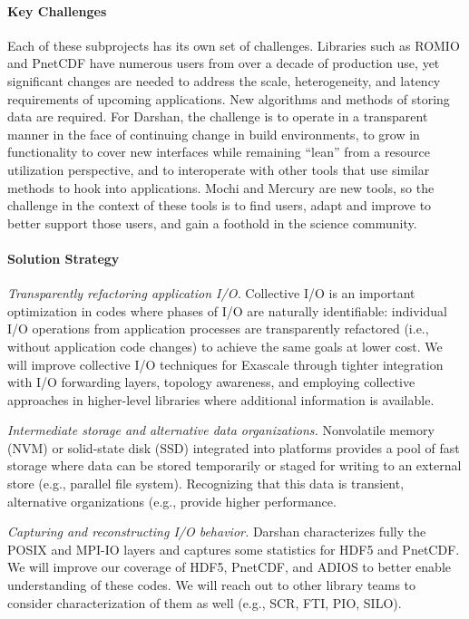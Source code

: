 \paragraph{Key Challenges}

Each of these subprojects has its own set of challenges. Libraries
such as ROMIO and PnetCDF have numerous users from over a decade of
production use, yet significant changes are needed to address the
scale, heterogeneity, and latency requirements of upcoming
applications. New algorithms and methods of storing data are required.
%
For Darshan, the challenge is to operate in a transparent manner in
the face of continuing change in build environments, to grow in
functionality to cover new interfaces while remaining ``lean'' from a
resource utilization perspective, and to interoperate with other tools
that use similar methods to hook into applications.
%
Mochi and Mercury are new tools, so the challenge in the context of
these tools is to find users, adapt and improve to better support
those users, and gain a foothold in the science community.

\paragraph{Solution Strategy}

\emph{Transparently refactoring application I/O.}
Collective I/O is an important optimization in codes where phases of
I/O are naturally identifiable: individual I/O operations from
application processes are transparently refactored (i.e., without
application code changes) to achieve the same goals at lower cost. We
will improve collective I/O techniques for Exascale through tighter
integration with I/O forwarding layers, topology awareness, and
employing collective approaches in higher-level libraries where
additional information is available.

\emph{Intermediate storage and alternative data organizations.}
Nonvolatile memory (NVM) or
solid-state disk (SSD) integrated into platforms provides a pool of
fast storage where data can be stored temporarily or staged for
writing to an external store (e.g., parallel file system). Recognizing
that this data is transient, alternative organizations (e.g.,
provide higher performance.

\emph{Capturing and reconstructing I/O behavior.}
Darshan characterizes fully the POSIX and MPI-IO layers and captures
some statistics for HDF5 and PnetCDF. We will improve our coverage of
HDF5, PnetCDF, and ADIOS to better enable understanding of these
codes. We will reach out to other library teams to consider
characterization of them as well (e.g., SCR, FTI, PIO, SILO).

